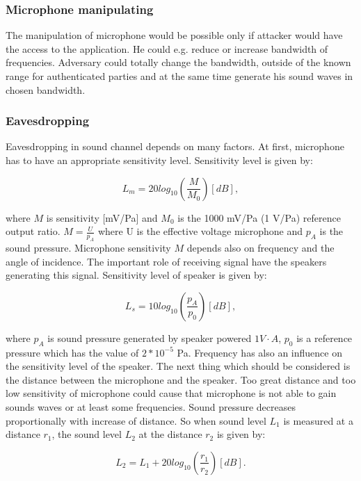 \documentclass[11pt,titlepage]{article}
\theoremstyle{plain}
\begin{document}
\subsubsection{Microphone manipulating}
The manipulation of microphone would be possible only if attacker would have the access to the application. He could e.g. reduce or increase bandwidth of frequencies. Adversary could totally change the bandwidth, outside of the known range for authenticated parties and at the same time generate his sound waves in chosen bandwidth.

\subsubsection{Eavesdropping}
Eavesdropping in sound channel depends on many factors.
 At first, microphone has to have an appropriate sensitivity level. Sensitivity level is given by:
 
 \begin{equation}
 L_m = 20 log_{10}\left(\frac{M}{M_0}\right)[dB],
 \end{equation}
 
 where $M$ is sensitivity [mV/Pa] and $M_0$ is the 1000 mV/Pa (1 V/Pa) reference output ratio. $M = \frac{U}{p_A}$ where U is the effective voltage microphone and $p_A$ is the sound pressure. Microphone sensitivity $M$ depends also on frequency and the angle of incidence. The important role of receiving signal have the speakers generating this signal. Sensitivity level of speaker is given by: 
 
 \begin{equation}
 L_s = 10 log_{10}\left(\frac{p_A}{p_0}\right)[dB],
 \end{equation}
 
 where $p_A$ is sound pressure generated by speaker powered $1V \cdot A$, $p_0$ is a reference pressure which has the value of $2*10^{-5}$ Pa. Frequency has also an influence on the sensitivity level of the speaker. The next thing which should be considered is the distance between the microphone and the speaker. Too great distance and too low sensitivity of microphone could cause that microphone is not able to gain sounds waves or at least some frequencies. Sound pressure decreases proportionally with increase of distance. So when sound level $L_{1}$ is measured at a distance $r_1$, the sound level $L_2$ at the distance $r_2$ is given by:
 
 \begin{equation}
 L_2 = L_1 + 20 log_{10} \left(\frac{r_1}{r_2}\right)[dB].
 \end{equation}
\end{document}
